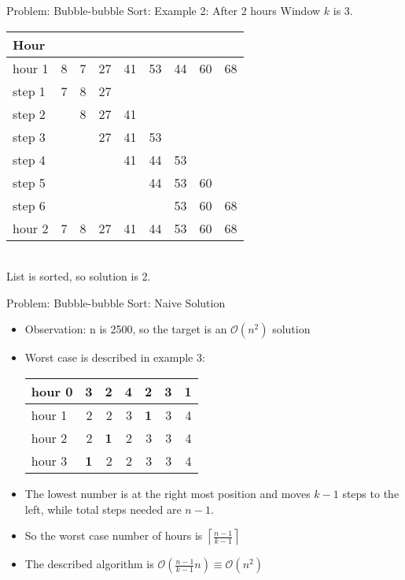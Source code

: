 \documentclass[11pt,pdf, aspectratio=169]{beamer}
\begin{document}
  \begin{frame}{Problem: Bubble-bubble Sort: Example 2: After 2 hours}
    Window $k$ is 3.\\
    \begin{tabular}{|l|rrrrrrrr|}
      \hline
      Hour   &   &   &    &    &    &    &    &    \\
      \hline
      hour 1 & 8 & 7 & 27 & 41 & 53 & 44 & 60 & 68 \\
      \hline
      step 1 & 7 & 8 & 27 &    &    &    &    &    \\
      step 2 &   & 8 & 27 & 41 &    &    &    &    \\
      step 3 &   &   & 27 & 41 & 53 &    &    &    \\
      step 4 &   &   &    & 41 & 44 & 53 &    &    \\
      step 5 &   &   &    &    & 44 & 53 & 60 &    \\
      step 6 &   &   &    &    &    & 53 & 60 & 68 \\
      \hline
      hour 2 & 7 & 8 & 27 & 41 & 44 & 53 & 60 & 68 \\
      \hline
    \end{tabular}\\
    List is sorted, so solution is 2.
  \end{frame}
  \begin{frame}{Problem: Bubble-bubble Sort: Naive Solution}
    \begin{itemize}
      \item<1-> Observation: n is 2500, so the target is an $\mathcal{O}(n^2)$  solution
      \item<2-> Worst case is described in example 3:\\
      \begin{tabular}{|l|rrrrrr|}
        \hline
        hour 0 & 3          & 2          & 4 & 2          & 3 & \textbf{1} \\
        \hline
        hour 1 & 2          & 2          & 3 & \textbf{1} & 3 & 4          \\
        hour 2 & 2          & \textbf{1} & 2 & 3          & 3 & 4          \\
        \hline
        hour 3 & \textbf{1} & 2          & 2 & 3          & 3 & 4          \\
        \hline
      \end{tabular}
      \item<3-> The lowest number is at the right most position and moves $k-1$ steps to the left, while total steps needed are $n-1$.
      \item<3-> So the worst case number of hours is $\left\lceil\frac{n-1}{k-1}\right\rceil$
      \item<4-> The described algorithm is $\mathcal{O}\left(\frac{n-1}{k-1}n\right) \equiv \mathcal{O}(n^2)$
    \end{itemize}
  \end{frame}
\end{document}

